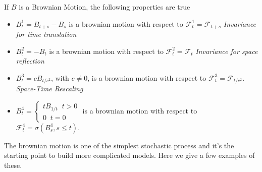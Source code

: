 \begin{proposition}
    If $B$ is a Brownian Motion, the following properties are true
    \begin{itemize}
        \item $B_t^1 = B_{t+s}-B_s$ is a brownian motion with respect to $\mathcal{F}^1_t = \mathcal{F}_{t+s}$ \;\;\;\; \textit{Invariance for time translation}
        \item $B_t^2 = - B_t$ is a brownian motion with respect to $\mathcal{F}^2_t = \mathcal{F}_t$ \;\;\;\; \textit{Invariance for space reflection}
        \item $B_t^3 = c B_{t/c^2}$, with $c \neq 0$, is a brownian motion with respect to $\mathcal{F}_t^3 = \mathcal{F}_{t/c^2}$. \;\;\;\; \textit{Space-Time Rescaling}
        \item $B_t^4 = \begin{cases}
            t B_{1/t} \;\; t > 0 \\
            0 \;\; t = 0
        \end{cases}$ is a brownian motion with respect to $\mathcal{F}^4_t = \sigma(B^4_s, s \leq t)$. 
    \end{itemize}
\end{proposition}

The brownian motion is one of the simplest stochastic process and it's the starting point to build more complicated models. Here we give a few examples of these. 

